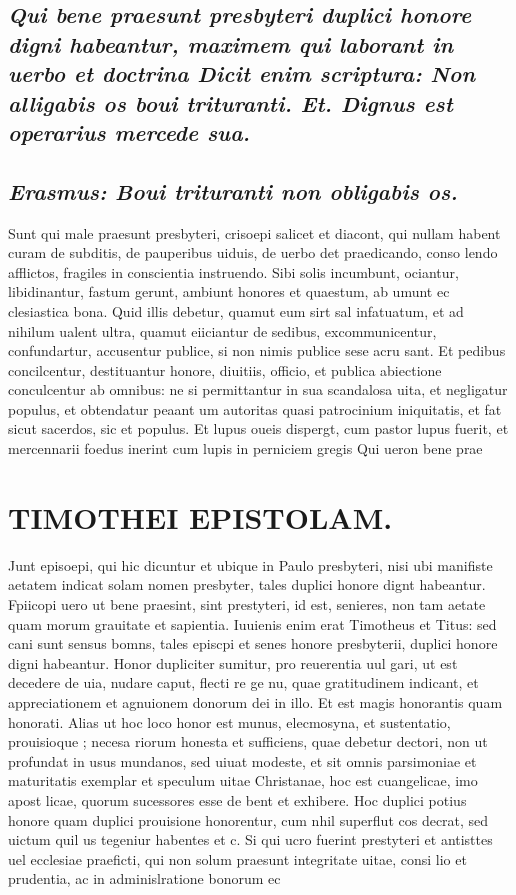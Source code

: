 \documentclass{article}
\begin{document}
\begin{pages}
\subsection*{\textit{Qui bene praesunt presbyteri duplici honore digni habeantur, maximem qui laborant in uerbo et doctrina Dicit enim scriptura: Non alligabis os boui trituranti. Et. Dignus est operarius mercede sua. }}
{}
\subsection*{\textit{Erasmus: Boui trituranti non obligabis os. }}\pstart Sunt qui male praesunt presbyteri, crisoepi salicet et diacont, qui nullam habent curam de subditis, de pauperibus uiduis, de uerbo det praedicando, conso lendo afflictos, fragiles in conscientia instruendo. Sibi solis incumbunt, ociantur, libidinantur, fastum gerunt, ambiunt honores et quaestum, ab umunt ec clesiastica bona. Quid illis debetur, quamut eum sirt sal infatuatum, et ad nihilum ualent ultra, quamut eiiciantur de sedibus, excommunicentur, confundartur, accusentur publice, si non nimis publice sese acru sant. Et pedibus concilcentur, destituantur honore, diuitiis, officio, et publica abiectione conculcentur ab omnibus: ne si permittantur in sua scandalosa uita, et negligatur populus, et obtendatur peaant um autoritas quasi patrocinium iniquitatis, et fat sicut sacerdos, sic et populus. Et lupus oueis dispergt, cum pastor lupus fuerit, et mercennarii foedus inerint cum lupis in perniciem gregis Qui ueron bene prae  \pend
\section*{TIMOTHEI EPISTOLAM. }
\marginpar{[ p.137 ]}\pstart Junt episoepi, qui hic dicuntur et ubique in Paulo presbyteri, nisi ubi manifiste aetatem indicat solam nomen presbyter, tales duplici honore dignt habeantur. Fpiicopi uero ut bene praesint, sint prestyteri, id est, senieres, non tam aetate quam morum grauitate et sapientia. Iuuienis enim erat Timotheus et Titus: sed cani sunt sensus bomns, tales episcpi et senes honore presbyterii, duplici honore digni habeantur. Honor dupliciter sumitur, pro reuerentia uul gari, ut est decedere de uia, nudare caput, flecti re ge nu, quae gratitudinem indicant, et appreciationem et agnuionem donorum dei in illo. Et est magis honorantis quam honorati. Alias ut hoc loco honor est munus, elecmosyna, et sustentatio, prouisioque ; necesa riorum honesta et sufficiens, quae debetur dectori, non ut profundat in usus mundanos, sed uiuat modeste, et sit omnis parsimoniae et maturitatis exemplar et speculum uitae Christanae, hoc est cuangelicae, imo apost licae, quorum sucessores esse de bent et exhibere. Hoc duplici potius honore quam duplici prouisione honorentur, cum nhil superflut cos decrat, sed uictum quil us tegeniur habentes et c. Si qui ucro fuerint prestyteri et antisttes uel ecclesiae praeficti, qui non solum praesunt integritate uitae, consi lio et prudentia, ac in adminislratione bonorum ec  \pend

\end{pages}
\end{document}

